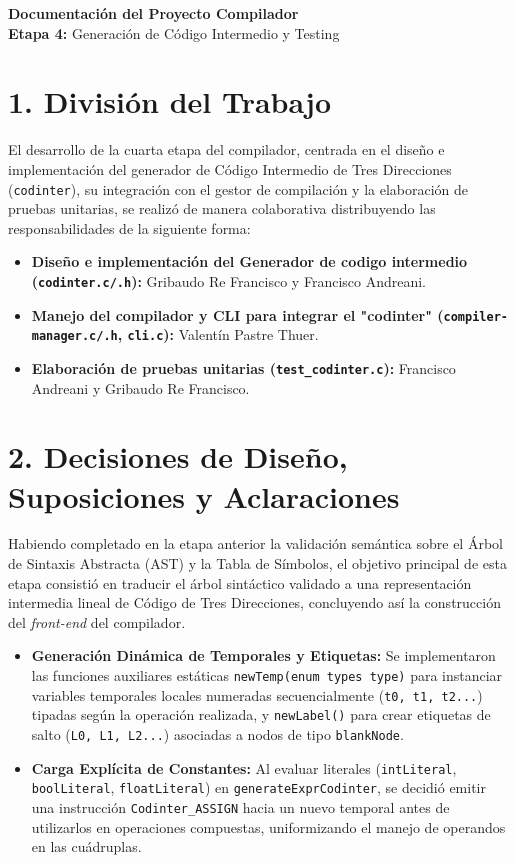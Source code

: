\documentclass[12pt, a4paper]{article}
\begin{document}
\begin{center}
    {\LARGE \textbf{\textcolor{primary}{Documentación del Proyecto Compilador}}} \\
    \vspace{0.5cm}
    {\large \textbf{Etapa 4:} Generación de Código Intermedio y Testing}
\end{center}
\vspace{0.8cm}

\section{1. División del Trabajo}
El desarrollo de la cuarta etapa del compilador, centrada en el diseño e implementación del generador de Código Intermedio de Tres Direcciones (\texttt{codinter}), su integración con el gestor de compilación y la elaboración de pruebas unitarias, se realizó de manera colaborativa distribuyendo las responsabilidades de la siguiente forma:

\begin{itemize}
    \item \textbf{Diseño e implementación del Generador de codigo intermedio (\texttt{codinter.c/.h}):} Gribaudo Re Francisco y Francisco Andreani.
    \item \textbf{Manejo del compilador y CLI para integrar el "codinter" (\texttt{compiler-manager.c/.h}, \texttt{cli.c}):} Valentín Pastre Thuer.
    \item \textbf{Elaboración de pruebas unitarias (\texttt{test\_codinter.c}):} Francisco Andreani y Gribaudo Re Francisco.
\end{itemize}

\section{2. Decisiones de Diseño, Suposiciones y Aclaraciones}
Habiendo completado en la etapa anterior la validación semántica sobre el Árbol de Sintaxis Abstracta (AST) y la Tabla de Símbolos, el objetivo principal de esta etapa consistió en traducir el árbol sintáctico validado a una representación intermedia lineal de Código de Tres Direcciones, concluyendo así la construcción del \textit{front-end} del compilador.

\begin{itemize}
    \item \textbf{Generación Dinámica de Temporales y Etiquetas:} Se implementaron las funciones auxiliares estáticas \texttt{newTemp(enum types type)} para instanciar variables temporales locales numeradas secuencialmente (\texttt{t0, t1, t2...}) tipadas según la operación realizada, y \texttt{newLabel()} para crear etiquetas de salto (\texttt{L0, L1, L2...}) asociadas a nodos de tipo \texttt{blankNode}.
    \item \textbf{Carga Explícita de Constantes:} Al evaluar literales (\texttt{intLiteral}, \texttt{boolLiteral}, \texttt{floatLiteral}) en \texttt{generateExprCodinter}, se decidió emitir una instrucción \texttt{Codinter\_ASSIGN} hacia un nuevo temporal antes de utilizarlos en operaciones compuestas, uniformizando el manejo de operandos en las cuádruplas.
\end{itemize}
\end{document}
